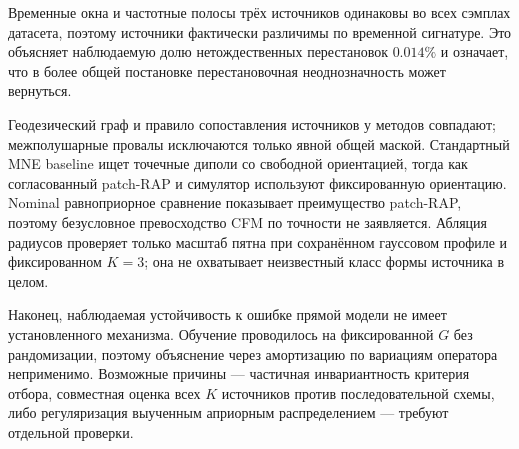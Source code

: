 Временные окна и частотные полосы трёх источников одинаковы во всех сэмплах датасета, поэтому источники фактически различимы по временной сигнатуре. Это объясняет наблюдаемую долю нетождественных перестановок $0.014\%$ и означает, что в более общей постановке перестановочная неоднозначность может вернуться.

Геодезический граф и правило сопоставления источников у методов совпадают; межполушарные провалы исключаются только явной общей маской. Стандартный MNE baseline ищет точечные диполи со свободной ориентацией, тогда как согласованный patch-RAP и симулятор используют фиксированную ориентацию. Nominal равноприорное сравнение показывает преимущество patch-RAP, поэтому безусловное превосходство CFM по точности не заявляется. Абляция радиусов проверяет только масштаб пятна при сохранённом гауссовом профиле и фиксированном $K=3$; она не охватывает неизвестный класс формы источника в целом.

Наконец, наблюдаемая устойчивость к ошибке прямой модели не имеет установленного механизма. Обучение проводилось на фиксированной $G$ без рандомизации, поэтому объяснение через амортизацию по вариациям оператора неприменимо. Возможные причины --- частичная инвариантность критерия отбора, совместная оценка всех $K$ источников против последовательной схемы, либо регуляризация выученным априорным распределением --- требуют отдельной проверки.
